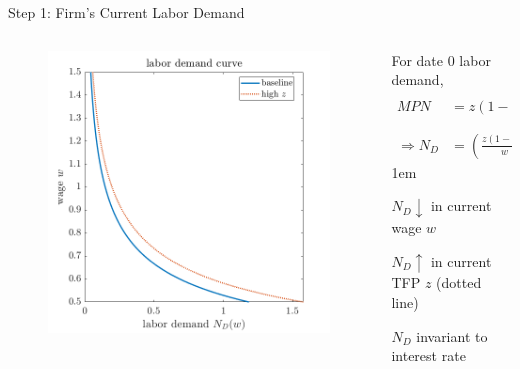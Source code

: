 \documentclass[11pt,aspectratio=43]{beamer}
\let\olditemize=\itemize
\let\endolditemize=\enditemize
\renewenvironment{itemize}{\olditemize \itemsep1em}{\endolditemize}
\theoremstyle{definition}
\begin{document}
\begin{frame}{Step 1: Firm's Current Labor Demand}
\label{slide:Step_1__Firm_s_Current_Labor_Demand}
    \begin{columns}
        \begin{column}{0.5\textwidth}
            \begin{figure}
                \includegraphics[width=\textwidth]{./figures/LaborDemandTFP.png}
            \end{figure}
        \end{column}
        \begin{column}{0.5\textwidth}
            For date 0 labor demand,
            \begin{align*}
                MPN
                    & = z ( 1-\alpha ) \left(
                        \frac{K}{ N_{D}}
                    \right)^{\alpha} = w
                \\
                \Rightarrow N_{D}
                    & = \left(
                        \frac{z ( 1-\alpha )}{w}
                    \right)^{\frac{1}{\alpha}} K
            \end{align*}
            \begin{itemize}
                \item $ N_{D} \downarrow $ in current wage $ w $
                \item $ N_{D} \uparrow  $ in current TFP $ z $ (dotted line)
                \item $ N_{D} $ invariant to interest rate
            \end{itemize}
        \end{column}
    \end{columns}
\end{frame}
\end{document}
